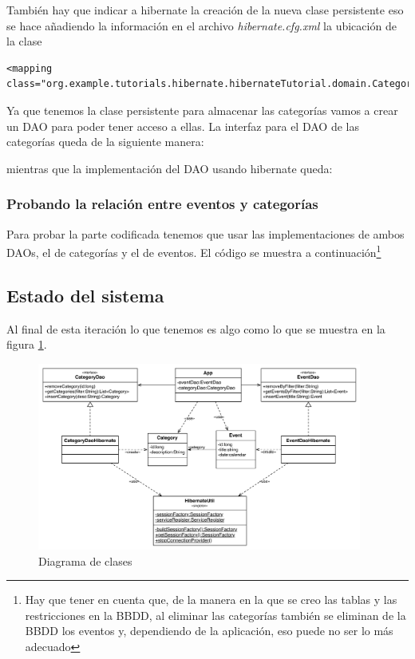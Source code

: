 \documentclass{article}
\begin{document}
	También hay que indicar a hibernate la creación de la nueva clase persistente eso se hace añadiendo la información en el archivo \emph{hibernate.cfg.xml} la ubicación de la clase
\begin{lstlisting}[style=xml]
<mapping class="org.example.tutorials.hibernate.hibernateTutorial.domain.Category"/>
\end{lstlisting}

	Ya que tenemos la clase persistente para almacenar las categorías vamos a crear un DAO para poder tener acceso a ellas. La interfaz para el DAO de las categorías queda de la siguiente manera:


	mientras que la implementación del DAO usando hibernate queda:


\subsubsection{Probando la relación entre eventos y categorías}
	Para probar la parte codificada tenemos que usar las implementaciones de ambos DAOs, el de categorías y el de eventos. El código se muestra a continuación\footnote{Hay que tener en cuenta que, de la manera en la que se creo las tablas y las restricciones en la BBDD, al eliminar las categorías también se eliminan de la BBDD los eventos y, dependiendo de la aplicación, eso puede no ser lo más adecuado}


\subsection{Estado del sistema}
	Al final de esta iteración lo que tenemos es algo como lo que se muestra en la figura \ref{fig:c04:UmlClass}.
\begin{figure}[h]
  \centering
    \includegraphics[width=0.95\textwidth]{commit04/img/UmlClass.pdf}
  \caption{Diagrama de clases}
  \label{fig:c04:UmlClass}
\end{figure}	
\end{document}
